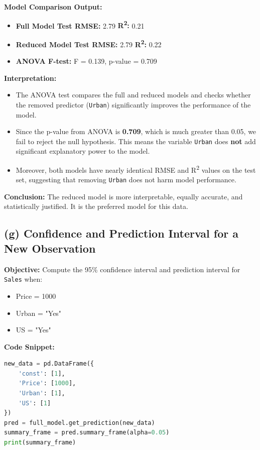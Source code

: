 \documentclass[12pt]{article}
\begin{document}
\vspace{1em}
\textbf{Model Comparison Output:}
\begin{itemize}
    \item \textbf{Full Model Test RMSE:} 2.79 \quad \textbf{R\textsuperscript{2}:} 0.21
    \item \textbf{Reduced Model Test RMSE:} 2.79 \quad \textbf{R\textsuperscript{2}:} 0.22
    \item \textbf{ANOVA F-test:} F = 0.139, p-value = 0.709
\end{itemize}

\vspace{1em}
\textbf{Interpretation:}
\begin{itemize}
    \item The ANOVA test compares the full and reduced models and checks whether the removed predictor (\texttt{Urban}) significantly improves the performance of the model.
    \item Since the p-value from ANOVA is \textbf{0.709}, which is much greater than 0.05, we fail to reject the null hypothesis. This means the variable \texttt{Urban} does \textbf{not} add significant explanatory power to the model.
    \item Moreover, both models have nearly identical RMSE and R\textsuperscript{2} values on the test set, suggesting that removing \texttt{Urban} does not harm model performance.
\end{itemize}

\textbf{Conclusion:} The reduced model is more interpretable, equally accurate, and statistically justified. It is the preferred model for this data.

\subsection*{(g) Confidence and Prediction Interval for a New Observation}

\textbf{Objective:} Compute the 95\% confidence interval and prediction interval for \texttt{Sales} when:
\begin{itemize}
    \item Price = 1000
    \item Urban = "Yes"
    \item US = "Yes"
\end{itemize}

\noindent\textbf{Code Snippet:}
\begin{lstlisting}[language=Python]
new_data = pd.DataFrame({
    'const': [1],
    'Price': [1000],
    'Urban': [1],
    'US': [1]
})
pred = full_model.get_prediction(new_data)
summary_frame = pred.summary_frame(alpha=0.05)
print(summary_frame)
\end{lstlisting}
\end{document}
